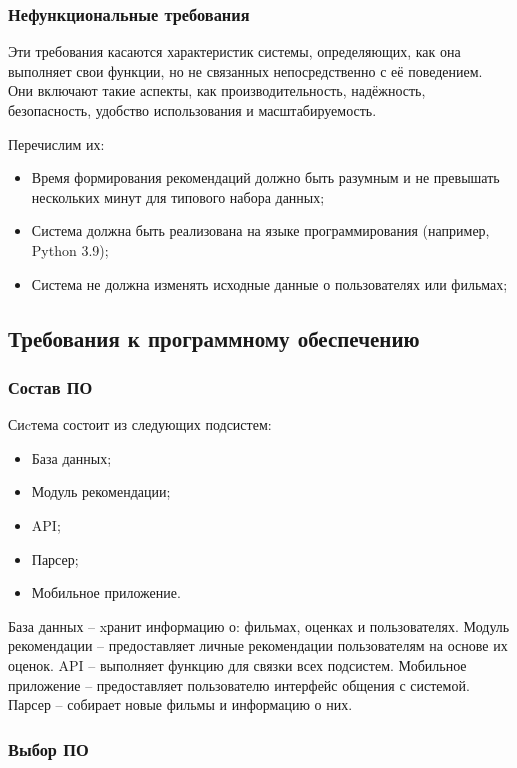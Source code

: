 \subsubsection{Нефункциональные требования}

Эти требования касаются характеристик системы, определяющих,
как она выполняет свои функции, но не связанных непосредственно с её поведением.
Они включают такие аспекты, как производительность, надёжность, безопасность,
удобство использования и масштабируемость.

Перечислим их:

\begin{itemize}
	\item Время формирования рекомендаций должно быть разумным и не превышать нескольких минут для типового набора данных;
	\item Система должна быть реализована на языке программирования (например, Python 3.9);
	\item Система не должна изменять исходные данные о пользователях или фильмах;
\end{itemize}

\subsection{Требования к программному обеспечению}

\subsubsection{Состав ПО}

Сиcтема состоит из следующих подсистем:
\begin{itemize}
	\item База данных;
	\item Модуль рекомендации;
	\item API;
	\item Парсер;
	\item Мобильное приложение.
\end{itemize}

База данных -- xранит информацию о: фильмах, оценках и пользователях.
Модуль рекомендации -- предоставляет личные рекомендации пользователям на основе их оценок.
API -- выполняет функцию для связки всех подсистем.
Мобильное приложение -- предоставляет пользователю интерфейс общения с системой.
Парсер -- собирает новые фильмы и информацию о них.

\subsubsection{Выбор ПО}


